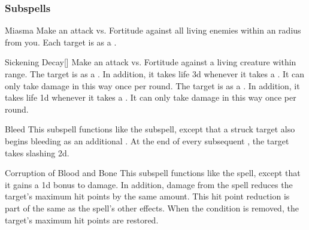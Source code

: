 \subsubsection{Subspells}


\begin{ability}[\nth{1}]{Miasma}
Make an attack vs. Fortitude against all living enemies within an \areamed radius from you.
\hit Each target is  as a .
\end{ability}
\vspace{0.25em}


\begin{ability}[\nth{1}]{Sickening Decay}[]
Make an attack vs. Fortitude against a living creature within \rngclose range.
\hit The target is  as a .
In addition, it takes life  \minus3d whenever it takes a .
It can only take damage in this way once per round.
\crit The target is  as a .
In addition, it takes life  \minus1d whenever it takes a .
It can only take damage in this way once per round.
\end{ability}
\vspace{0.25em}


\begin{ability}[\nth{3}]{Bleed}
This subspell functions like the  subspell, except that a struck target also begins bleeding as an additional .
At the end of every subsequent , the target takes slashing  \minus2d.
\end{ability}
\vspace{0.25em}


\begin{ability}[\nth{3}]{Corruption of Blood and Bone}
This subspell functions like the  spell, except that it gains a \plus1d bonus to damage.
In addition, damage from the spell reduces the target's maximum hit points by the same amount.
This hit point reduction is part of the same  as the spell's other effects.
When the condition is removed, the target's maximum hit points are restored.
\end{ability}
\vspace{0.25em}



